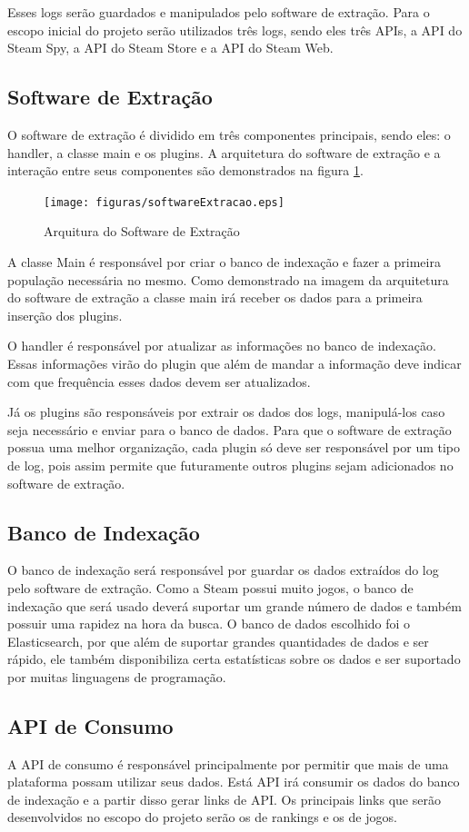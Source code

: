 Esses logs serão guardados e manipulados pelo software de extração. Para o escopo inicial do projeto serão utilizados três logs, sendo eles três APIs, a API do Steam Spy, a API do Steam Store e a API do Steam Web.
\subsection{Software de Extração}
O software de extração é dividido em três componentes principais, sendo eles: o handler, a classe main e os plugins. A arquitetura do software de extração e a interação entre seus componentes são demonstrados na figura \ref{image:extracao}.
\begin{figure}
\centering
\texttt{[image: figuras/softwareExtracao.eps]}
\caption{Arquitura do Software de Extração}
\label{image:extracao}
\end{figure}
A classe Main é responsável por criar o banco de indexação e fazer a primeira população necessária no mesmo. Como demonstrado na imagem da arquitetura do software de extração a classe main irá receber os dados para a primeira inserção dos plugins.

O handler é responsável por atualizar as informações no banco de indexação. Essas informações virão do plugin que além de mandar a informação deve indicar com que frequência esses dados devem ser atualizados.

Já os plugins são responsáveis por extrair os dados dos logs, manipulá-los caso seja necessário e enviar para o banco de dados. Para que o software de extração possua uma melhor organização, cada plugin só deve ser responsável por um tipo de log, pois assim permite que futuramente outros plugins sejam adicionados no software de extração.
\subsection{Banco de Indexação}
O banco de indexação será responsável por guardar os dados extraídos do log pelo software de extração. Como a Steam possui muito jogos, o banco de indexação que será usado deverá suportar um grande número de dados e também possuir uma rapidez na hora da busca. O banco de dados escolhido foi o Elasticsearch, por que além de suportar grandes quantidades de dados e ser rápido, ele também disponibiliza certa estatísticas sobre os dados e ser suportado por muitas linguagens de programação.
\subsection{API de Consumo}
A API de consumo é responsável principalmente por permitir que mais de uma plataforma possam utilizar seus dados. Está API irá consumir os dados do banco de indexação e a partir disso gerar links de API. Os principais links que serão desenvolvidos no escopo do projeto serão os de rankings e os de jogos.
